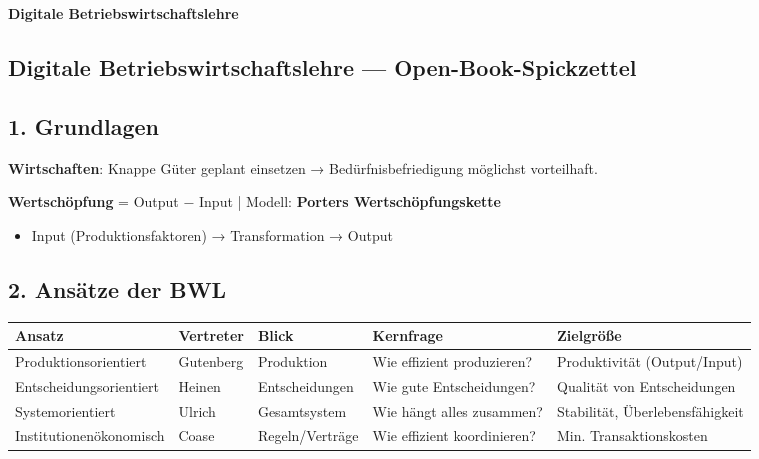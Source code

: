 \documentclass[10pt, a4paper]{article}
\providecommand{\nichttitle}{Formelsammlung}
\renewcommand{\nichttitle}{Digitale Betriebswirtschaftslehre}
\begin{document}
\begin{center}
{\small\bfseries\color{accent}\nichttitle}
\end{center}
\vspace{-6pt}

\scriptsize
\begin{multicols}{2}


\section{Digitale Betriebswirtschaftslehre — Open-Book-Spickzettel}


\subsection{1. Grundlagen}

\textbf{Wirtschaften}: Knappe Güter geplant einsetzen → Bedürfnisbefriedigung möglichst vorteilhaft.

\textbf{Wertschöpfung} = Output − Input | Modell: \textbf{Porters Wertschöpfungskette}

\begin{itemize}
  \item Input (Produktionsfaktoren) → Transformation → Output
\end{itemize}


\subsection{2. Ansätze der BWL}


{\small
\begin{adjustbox}{max width=\linewidth}
{\scriptsize
\begin{tabular}{lllll}
\toprule
\textbf{Ansatz} & \textbf{Vertreter} & \textbf{Blick} & \textbf{Kernfrage} & \textbf{Zielgröße} \\
\midrule
Produktionsorientiert & Gutenberg & Produktion & Wie effizient produzieren? & Produktivität (Output/Input) \\
Entscheidungsorientiert & Heinen & Entscheidungen & Wie gute Entscheidungen? & Qualität von Entscheidungen \\
Systemorientiert & Ulrich & Gesamtsystem & Wie hängt alles zusammen? & Stabilität, Überlebensfähigkeit \\
Institutionenökonomisch & Coase & Regeln/Verträge & Wie effizient koordinieren? & Min. Transaktionskosten \\
\bottomrule
\end{tabular}
}
\end{adjustbox}
}



\end{multicols}
\end{document}

